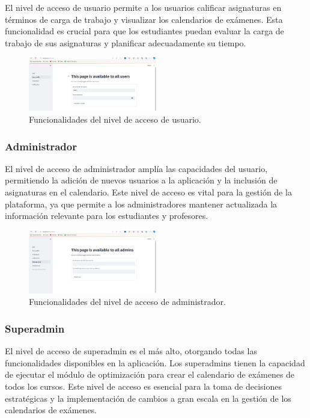 \documentclass{article}
\begin{document}
El nivel de acceso de usuario permite a los usuarios calificar asignaturas en términos de carga de trabajo y visualizar los calendarios de exámenes. Esta funcionalidad es crucial para que los estudiantes puedan evaluar la carga de trabajo de sus asignaturas y planificar adecuadamente su tiempo.

\begin{figure}[h!] \centering \includegraphics[width=0.5\textwidth]{nivel_usuario.png} \caption{Funcionalidades del nivel de acceso de usuario.} \end{figure}

\subsubsection{Administrador}

El nivel de acceso de administrador amplía las capacidades del usuario, permitiendo la adición de nuevos usuarios a la aplicación y la inclusión de asignaturas en el calendario. Este nivel de acceso es vital para la gestión de la plataforma, ya que permite a los administradores mantener actualizada la información relevante para los estudiantes y profesores.

\begin{figure}[h!] \centering \includegraphics[width=0.5\textwidth]{nivel_administrador.png} \caption{Funcionalidades del nivel de acceso de administrador.} \end{figure}

\subsubsection{Superadmin}

El nivel de acceso de superadmin es el más alto, otorgando todas las funcionalidades disponibles en la aplicación. Los superadmins tienen la capacidad de ejecutar el módulo de optimización para crear el calendario de exámenes de todos los cursos. Este nivel de acceso es esencial para la toma de decisiones estratégicas y la implementación de cambios a gran escala en la gestión de los calendarios de exámenes.
\end{document}
